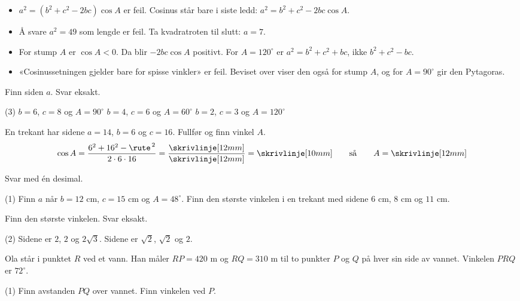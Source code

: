 \begin{vanligfeil}
\begin{itemize}[leftmargin=1.2em,itemsep=1pt,topsep=0pt]
  \item $a^2 = (b^2 + c^2 - 2bc)\cos A$ er feil. Cosinus står bare i siste ledd: $a^2 = b^2 + c^2 - 2bc\cos A$.
  \item Å svare $a^2 = 49$ som lengde er feil. Ta kvadratroten til slutt: $a = 7$.
  \item For stump $A$ er $\cos A < 0$. Da blir $-2bc\cos A$ positivt. For $A = 120^\circ$ er $a^2 = b^2 + c^2 + bc$, ikke $b^2 + c^2 - bc$.
  \item «Cosinussetningen gjelder bare for spisse vinkler» er feil. Beviset over viser den også for stump $A$, og for $A = 90^\circ$ gir den Pytagoras.
\end{itemize}
\end{vanligfeil}


Finn siden $a$. Svar eksakt.
\begin{tasks}(3)
  \task $b = 6$, $c = 8$ og $A = 90^\circ$
  \task $b = 4$, $c = 6$ og $A = 60^\circ$
  \task $b = 2$, $c = 3$ og $A = 120^\circ$
\end{tasks}

En trekant har sidene $a = 14$, $b = 6$ og $c = 16$. Fullfør og finn vinkel $A$.
\[ \cos A = \frac{6^2 + 16^2 - \rute^{\,2}}{2 \cdot 6 \cdot 16} = \frac{\skrivlinje[12mm]}{\skrivlinje[12mm]} = \skrivlinje[10mm] \qquad\text{så}\qquad A = \skrivlinje[12mm] \]

Svar med én desimal.
\begin{tasks}(1)
  \task Finn $a$ når $b = 12$ cm, $c = 15$ cm og $A = 48^\circ$.
  \task Finn den største vinkelen i en trekant med sidene $6$ cm, $8$ cm og $11$ cm.
\end{tasks}


Finn den største vinkelen. Svar eksakt.
\begin{tasks}(2)
  \task Sidene er $2$, $2$ og $2\sqrt3$.
  \task Sidene er $\sqrt2$, $\sqrt2$ og $2$.
\end{tasks}

Ola står i punktet $R$ ved et vann. Han måler $RP = 420$ m og $RQ = 310$ m til to punkter $P$ og $Q$ på hver sin side av vannet. Vinkelen $PRQ$ er $72^\circ$.
\begin{tasks}(1)
  \task Finn avstanden $PQ$ over vannet.
  \task Finn vinkelen ved $P$.
\end{tasks}

